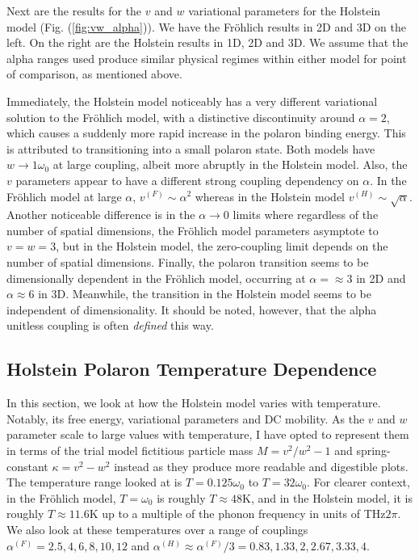 Next are the results for the $v$ and $w$ variational parameters for the Holstein model (Fig. (\ref{fig:vw_alpha})). We have the Fr\"ohlich results in 2D and 3D on the left. On the right are the Holstein results in 1D, 2D and 3D. We assume that the alpha ranges used produce similar physical regimes within either model for point of comparison, as mentioned above.

Immediately, the Holstein model noticeably has a very different variational solution to the Fr\"ohlich model, with a distinctive discontinuity around $\alpha = 2$, which causes a suddenly more rapid increase in the polaron binding energy. This is attributed to transitioning into a small polaron state. Both models have $w \to 1 \omega_0$ at large coupling, albeit more abruptly in the Holstein model. Also, the $v$ parameters appear to have a different strong coupling dependency on $\alpha$. In the Fr\"ohlich model at large $\alpha$, $v^{(F)} \sim \alpha^2$ whereas in the Holstein model $v^{(H)} \sim \sqrt{\alpha}$. Another noticeable difference is in the $\alpha \to 0$ limits where regardless of the number of spatial dimensions, the Fr\"ohlich model parameters asymptote to $v = w = 3$, but in the Holstein model, the zero-coupling limit depends on the number of spatial dimensions. Finally, the polaron transition seems to be dimensionally dependent in the Fr\"ohlich model, occurring at $\alpha = \approx 3$ in 2D and $\alpha \approx 6$ in 3D. Meanwhile, the transition in the Holstein model seems to be independent of dimensionality. It should be noted, however, that the alpha unitless coupling is often \emph{defined} this way.

\subsection{Holstein Polaron Temperature Dependence}

In this section, we look at how the Holstein model varies with temperature. Notably, its free energy, variational parameters and DC mobility. As the $v$ and $w$ parameter scale to large values with temperature, I have opted to represent them in terms of the trial model fictitious particle mass $M = v^2 / w^2 - 1$ and spring-constant $\kappa = v^2 - w^2$ instead as they produce more readable and digestible plots. The temperature range looked at is $T = 0.125 \omega_0$ to $T = 32 \omega_0$. For clearer context, in the Fr\"ohlich model, $T = \omega_0$ is roughly $T \approx 48 $K, and in the Holstein model, it is roughly $T \approx 11.6 $K up to a multiple of the phonon frequency in units of THz$2\pi$. We also look at these temperatures over a range of couplings $\alpha^{(F)} = 2.5, 4, 6, 8, 10, 12$ and $\alpha^{(H)} \approx \alpha^{(F)} / 3 = 0.83, 1.33, 2, 2.67, 3.33, 4$.

